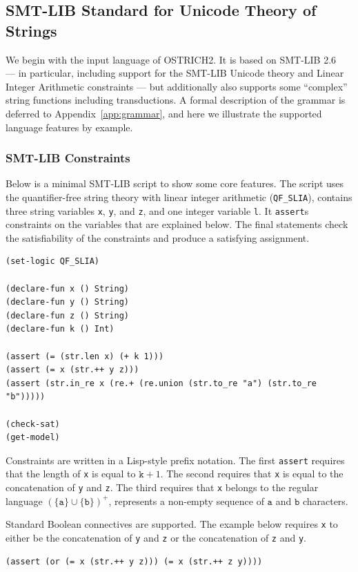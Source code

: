 
\subsection{SMT-LIB Standard for Unicode Theory of Strings}%

We begin with the input language of OSTRICH2\@.
It is based on SMT-LIB 2.6~\cite{SMTLIB} --- in particular, including support 
for the SMT-LIB Unicode theory and Linear Integer Arithmetic constraints
--- but additionally also supports some ``complex'' string functions including
transductions.
A formal description of the grammar is deferred to Appendix~\ref{app:grammar}, 
and here we illustrate the supported language features by example.

\subsubsection{SMT-LIB Constraints}

Below is a minimal SMT‑LIB script to show some core features.
The script uses the quantifier-free string theory with linear integer arithmetic (\verb+QF_SLIA+), contains three string variables \verb+x+, \verb+y+, and \verb+z+, and one integer variable \verb+l+.
It \verb+assert+s constraints on the variables that are explained below.
The final statements check the satisfiability of the constraints and produce a satisfying assignment.

\begin{lstlisting}[language=SMTLib,frame=single]
(set-logic QF_SLIA)

(declare-fun x () String)
(declare-fun y () String)
(declare-fun z () String)
(declare-fun k () Int)

(assert (= (str.len x) (+ k 1)))
(assert (= x (str.++ y z)))
(assert (str.in_re x (re.+ (re.union (str.to_re "a") (str.to_re "b")))))

(check-sat)
(get-model)
\end{lstlisting}

Constraints are written in a Lisp-style prefix notation.
The first \verb+assert+ requires that the length of \verb+x+ is equal to $\mathtt{k} + 1$.
The second requires that \verb+x+ is equal to the concatenation of \verb+y+ and \verb+z+.
The third requires that \verb+x+ belongs to the regular language
$(\{\mathtt{a}\} \cup \{\mathtt{b}\})^+$,
represents a non-empty sequence of $\mathtt{a}$ and $\mathtt{b}$ characters.

Standard Boolean connectives are supported.
The example below requires \verb+x+ to either be the concatenation of \verb+y+ and \verb+z+ or the concatenation of \verb+z+ and \verb+y+.
\begin{lstlisting}[language=SMTLib,frame=single]
(assert (or (= x (str.++ y z))) (= x (str.++ z y))))
\end{lstlisting}

